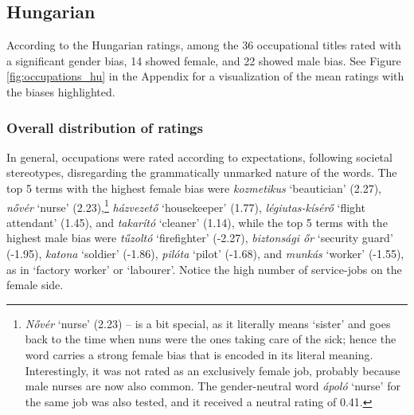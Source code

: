 \documentclass[11pt]{article}
\begin{document}
\subsection{Hungarian}



According to the Hungarian ratings, among the 36 occupational titles rated with a significant gender bias, 14 showed female, and 22 showed male bias. See Figure \ref{fig:occupations_hu} in the Appendix for a visualization of the mean ratings with the biases highlighted.

\subsubsection{Overall distribution of ratings}

In general, occupations were rated according to expectations, following societal stereotypes, disregarding the grammatically unmarked nature of the words. The top 5 terms with the highest female bias were \textit{kozmetikus} `beautician' (2.27), \textit{nővér} `nurse' (2.23),\footnote{\textit{Nővér} `nurse' (2.23) -- is a bit special, as it literally means `sister' and goes back to the time when nuns were the ones taking care of the sick; hence the word carries a strong female bias that is encoded in its literal meaning. Interestingly, it was not rated as an exclusively female job, probably because male nurses are now also common. The gender-neutral word \textit{ápoló} `nurse' for the same job was also tested, and it received a neutral rating of 0.41.} \textit{házvezető} `housekeeper' (1.77), \textit{légiutas-kísérő} `flight attendant' (1.45), and \textit{takarító} `cleaner' (1.14), while the top 5 terms with the highest male bias were \textit{tűzoltó} `firefighter' (-2.27), \textit{biztonsági őr} `security guard' (-1.95), \textit{katona} `soldier' (-1.86), \textit{pilóta} `pilot' (-1.68), and \textit{munkás} `worker' (-1.55), as in `factory worker' or `labourer'. Notice the high number of service-jobs on the female side.
\end{document}
